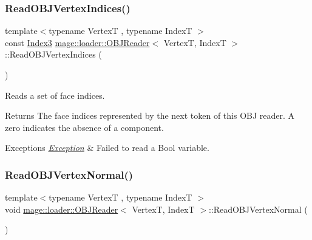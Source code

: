 \subsubsection{\texorpdfstring{Read\+O\+B\+J\+Vertex\+Indices()}{ReadOBJVertexIndices()}}
{\footnotesize\ttfamily template$<$typename VertexT , typename IndexT $>$ \\
const \hyperlink{classmage_1_1loader_1_1_o_b_j_reader_af9aab131e88c5a3a0f29b156c4c97096}{Index3} \hyperlink{classmage_1_1loader_1_1_o_b_j_reader}{mage\+::loader\+::\+O\+B\+J\+Reader}$<$ VertexT, IndexT $>$\+::Read\+O\+B\+J\+Vertex\+Indices (\begin{DoxyParamCaption}{ }\end{DoxyParamCaption})\hspace{0.3cm}{\ttfamily [private]}}

Reads a set of face indices.

\begin{DoxyReturn}{Returns}
The face indices represented by the next token of this O\+BJ reader. A zero indicates the absence of a component. 
\end{DoxyReturn}

\begin{DoxyExceptions}{Exceptions}
{\em \hyperlink{classmage_1_1_exception}{Exception}} & Failed to read a Bool variable. \\
\hline
\end{DoxyExceptions}
\hypertarget{classmage_1_1loader_1_1_o_b_j_reader_a999fe73e83855955723855c09955c7da}{}\label{classmage_1_1loader_1_1_o_b_j_reader_a999fe73e83855955723855c09955c7da} 
\subsubsection{\texorpdfstring{Read\+O\+B\+J\+Vertex\+Normal()}{ReadOBJVertexNormal()}}
{\footnotesize\ttfamily template$<$typename VertexT , typename IndexT $>$ \\
void \hyperlink{classmage_1_1loader_1_1_o_b_j_reader}{mage\+::loader\+::\+O\+B\+J\+Reader}$<$ VertexT, IndexT $>$\+::Read\+O\+B\+J\+Vertex\+Normal (\begin{DoxyParamCaption}{ }\end{DoxyParamCaption})\hspace{0.3cm}{\ttfamily [private]}}


